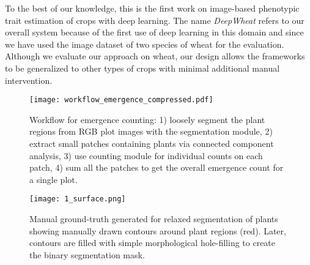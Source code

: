 \documentclass[10pt,twocolumn,letterpaper]{article}
\begin{document}


To the best of our knowledge, this is the first work on image-based phenotypic trait estimation of crops with deep learning. The name \textit{DeepWheat} refers to our overall system because of the first use of deep learning in this domain and since we have used the image dataset of two species of wheat for the evaluation. Although we evaluate our approach on wheat, our design allows the frameworks to be generalized to other types of crops with minimal additional manual intervention.


\begin{figure*}[t!]
	\centering
	\texttt{[image: workflow\_emergence\_compressed.pdf]}
    \caption{Workflow for emergence counting: 1) loosely segment the plant regions from RGB plot images with the segmentation module, 2) extract small patches containing plants via connected component analysis, 3) use counting module for individual counts on each patch, 4) sum all the patches to get the overall emergence count for a single plot.}
    \label{fig:workflow_emergence}
\end{figure*}

\begin{figure*}[]
	\centering
	\texttt{[image: 1\_surface.png]}
    \caption{Manual ground-truth generated for relaxed segmentation of plants showing manually drawn contours around plant regions (red). Later, contours are filled with simple morphological hole-filling to create the binary segmentation mask.}
    \label{fig:gt}
\end{figure*}
\end{document}
